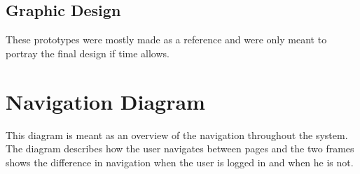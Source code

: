 \documentclass[paper=a4, fontsize=11pt]{scrartcl} %
\numberwithin{equation}{section} %
\numberwithin{figure}{section} %
\numberwithin{table}{section} %
\begin{document}
\begin{center}
\end{center}

\subsection{Graphic Design}
These prototypes were mostly made as a reference and were only meant to portray the final design if time allows.
\begin{center}
\end{center}

\section{Navigation Diagram}
This diagram is meant as an overview of the navigation throughout the system. The diagram describes how the user navigates between pages and the two frames shows the difference in navigation when the user is logged in and when he is not.
\begin{center}
\end{center}
\end{document}
